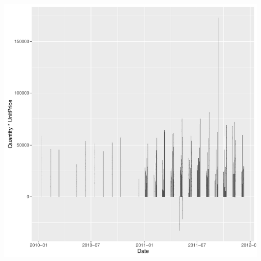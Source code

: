 \begin{itemize}
\begin{knitrout}
\begin{kframe}
{\ttfamily\noindent\color{warningcolor}{\#\# Warning: Stacking not well defined when ymin != 0}}\end{kframe}
\includegraphics[width=\maxwidth]{figure/histograma_transacciones-1} 

\end{knitrout}
  
\end{itemize}




